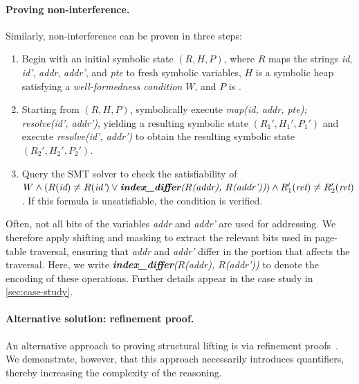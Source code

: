\paragraph{Proving non-interference.}
Similarly, non-interference can be proven in three steps:
\begin{enumerate}[leftmargin=*]
  \item Begin with an initial symbolic state \((R, H, P)\), where \(R\) maps the strings \textit{id}, \textit{id'}, \textit{addr},  \textit{addr'}, and \textit{pte} to fresh symbolic variables, \(H\) is a symbolic heap satisfying a \emph{well-formedness condition} \(W\), and \(P\) is \true.
  \item Starting from \((R, H, P)\), symbolically execute \textit{map(id, addr, pte); resolve(id', addr')}, yielding a resulting symbolic state \((R_1', H_1', P_1')\) and execute \textit{resolve(id', addr')} to obtain the resulting symbolic state \((R_2', H_2', P_2')\).
  \item Query the SMT solver to check the satisfiability of \(W\wedge(R(\textit{id}) \neq R(\textit{id'}) \vee  \textit{\textbf{index\_differ}($R$(addr), $R$(addr'))})\\ \wedge R_1'(\textit{ret}) \neq R_2'(\textit{ret})\).  If this formula is unsatisfiable, the condition is verified.
\end{enumerate}

Often, not all bits of the variables \textit{addr} and \textit{addr'} are used for addressing. We therefore apply shifting and masking to extract the relevant bits used in page-table traversal, ensuring that \textit{addr} and \textit{addr'} differ in the portion that affects the traversal. Here, we write \textit{\textbf{index\_differ}($R$(addr), $R$(addr'))} to denote the encoding of these operations. Further details appear in the case study in \autoref{sec:case-study}.



\paragraph{Alternative solution: refinement proof.}
An alternative approach to proving structural lifting is via refinement
proofs~\cite{brun23hotos,Brun2022VerifiedPaging}. We demonstrate, however, that
this approach necessarily introduces quantifiers, thereby increasing the
complexity of the reasoning.


